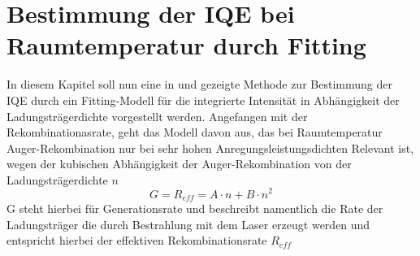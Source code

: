 
\section{Bestimmung der IQE bei Raumtemperatur durch Fitting}

\thispagestyle{fancy}

In diesem Kapitel soll nun eine in \cite{doi:10.1063/1.3100773} und \cite{doi:10.1063/1.4917540} gezeigte Methode zur Bestimmung der IQE durch ein Fitting-Modell für die integrierte Intensität in Abhängigkeit der Ladungsträgerdichte vorgestellt werden. Angefangen mit der Rekombinationasrate, geht das Modell davon aus,
das bei Raumtemperatur Auger-Rekombination nur bei sehr hohen Anregungsleistungsdichten Relevant ist, wegen der kubischen Abhängigkeit der Auger-Rekombination von der Ladungsträgerdichte $n$
\begin{equation}
    G = R_{eff} = A \cdot n + B \cdot n^2
\end{equation}    
G steht hierbei für Generationsrate und beschreibt namentlich die Rate der Ladungsträger die durch Bestrahlung mit dem Laser erzeugt werden und entspricht hierbei der effektiven Rekombinationsrate $R_{eff}$


